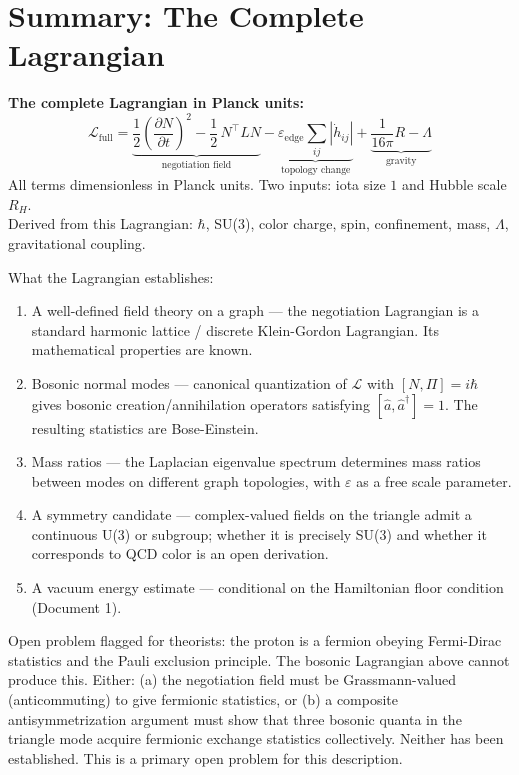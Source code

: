 \documentclass[11pt,letterpaper]{article}
\newenvironment{defbox}{\begin{tcolorbox}[colback=green!3!white,colframe=green!45!black,title={\small\textit{Foundational definition}},breakable]}{\end{tcolorbox}}
\begin{document}
\section{Summary: The Complete Lagrangian}
\label{sec:orgdd611e5}

\begin{defbox}
\textbf{The complete Lagrangian in Planck units:}
\[
\mathcal{L}_\text{full} = \underbrace{\frac{1}{2}\!\left(\frac{\partial N}{\partial t}\right)^{\!2} - \frac{1}{2}\,N^\top L N}_{\text{negotiation field}} - \underbrace{\varepsilon_\text{edge}\sum_{ij}|\dot{h}_{ij}|}_{\text{topology change}} + \underbrace{\frac{1}{16\pi}R - \Lambda}_{\text{gravity}}
\]
All terms dimensionless in Planck units. Two inputs: iota size $1$ and Hubble scale $R_H$.\\[4pt]
Derived from this Lagrangian: $\hbar$, SU(3), color charge, spin, confinement, mass, $\Lambda$, gravitational coupling.
\end{defbox}

What the Lagrangian establishes:
\begin{enumerate}
\item A well-defined field theory on a graph --- the negotiation Lagrangian is a standard harmonic lattice / discrete Klein-Gordon Lagrangian. Its mathematical properties are known.
\item Bosonic normal modes --- canonical quantization of \(\mathcal{L}\) with \([N, \Pi] = i\hbar\) gives bosonic creation/annihilation operators satisfying \([\hat{a}, \hat{a}^\dagger] = 1\). The resulting statistics are Bose-Einstein.
\item Mass ratios --- the Laplacian eigenvalue spectrum determines mass ratios between modes on different graph topologies, with \(\varepsilon\) as a free scale parameter.
\item A symmetry candidate --- complex-valued fields on the triangle admit a continuous U(3) or subgroup; whether it is precisely SU(3) and whether it corresponds to QCD color is an open derivation.
\item A vacuum energy estimate --- conditional on the Hamiltonian floor condition (Document 1).
\end{enumerate}

Open problem flagged for theorists: the proton is a fermion obeying Fermi-Dirac statistics and the Pauli exclusion principle. The bosonic Lagrangian above cannot produce this. Either: (a) the negotiation field must be Grassmann-valued (anticommuting) to give fermionic statistics, or (b) a composite antisymmetrization argument must show that three bosonic quanta in the triangle mode acquire fermionic exchange statistics collectively. Neither has been established. This is a primary open problem for this description.
\end{document}

